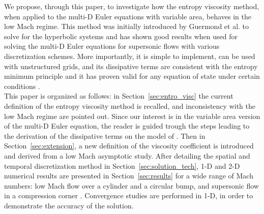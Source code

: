 \documentclass[preprint,10pt]{elsarticle}
\renewcommand{\div}{\vec{\nabla}\! \cdot \!}
\newcommand{\grad}{\vec{\nabla}}
\newcommand{\eqt}[1]{Eq.~(\ref{#1})}                     %
\newcommand{\sct}[1]{Section~\ref{#1}}                   %
\newcommand{\tcr}[1]{\textcolor{red}{#1}}
\begin{document}
We propose, through this paper, to investigate how the entropy viscosity method, when applied to the multi-D Euler equations with variable area, behaves in the low Mach regime. This method was initially introduced by Guermond et al. to solve for the hyperbolic systems and has shown good results when used for solving the multi-D Euler equations for supersonic flows with various discretization schemes. More importantly, it is simple to implement, can be used with unstructured grids,  and its dissipative terms are consistent with the entropy minimum principle and it has proven valid for any equation of state under certain conditions \cite{jlg}. \\

This paper is organized as follows: in \sct{sec:entro_visc} the current definition of the entropy viscosity method is recalled, and inconsistency with the low Mach regime are pointed out. Since our interest is in the variable area version of the multi-D Euler equation, the reader is guided trough the steps leading to the derivation of the dissipative terms on the model of \cite{jlg}. Then in \sct{sec:extension}, a new definition of the viscosity coefficient is introduced and derived from a low Mach asymptotic study. After detailing the spatial and temporal discretization method in \sct{sec:solution_tech}, 1-D and 2-D numerical results are presented in \sct{sec:results} for a wide range of Mach numbers: low Mach flow over a cylinder and a circular bump, and supersonic flow in a compression corner \cite{CompressionCorner}. Convergence studies are performed in 1-D, in order to demonstrate the accuracy of the solution. \\

\end{document}
